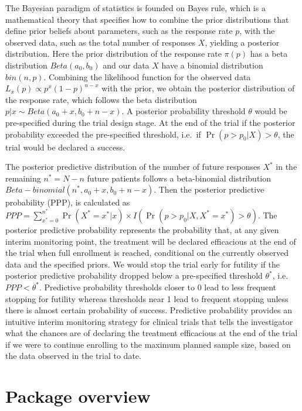 The Bayesian paradigm of statistics is founded on Bayes rule, which is a
mathematical theory that specifies how to combine the prior
distributions that define prior beliefs about parameters, such as the
response rate \(p\), with the observed data, such as the total number of
responses \(X\), yielding a posterior distribution. Here the prior
distribution of the response rate \(\pi(p)\) has a beta distribution
\(Beta(a_0, b_0)\) and our data \(X\) have a binomial distribution
\(bin(n, p)\). Combining the likelihood function for the observed data
\(L_x(p) \propto p^x (1-p)^{n-x}\) with the prior, we obtain the
posterior distribution of the response rate, which follows the beta
distribution \(p|x \sim Beta(a_0 + x, b_0 + n - x)\). A posterior
probability threshold \(\theta\) would be pre-specified during the trial
design stage. At the end of the trial if the posterior probability
exceeded the pre-specified threshold, i.e.~if
\(\Pr(p>p_0 | X) > \theta\), the trial would be declared a success.

The posterior predictive distribution of the number of future responses
\(X^*\) in the remaining \(n^*=N-n\) future patients follows a
beta-binomial distribution \(Beta-binomial(n^*, a_0 + x, b_0 + n - x)\).
Then the posterior predictive probability (PPP), is calculated as
\(PPP = \sum_{{x^*}=0}^{n^*} \Pr(X^*=x^*|x) \times I(\Pr(p>p_0 | X, X^*=x^*) > \theta)\).
The posterior predictive probability represents the probability that, at
any given interim monitoring point, the treatment will be declared
efficacious at the end of the trial when full enrollment is reached,
conditional on the currently observed data and the specified priors. We
would stop the trial early for futility if the posterior predictive
probability dropped below a pre-specified threshold \(\theta^*\),
i.e.~\(PPP<\theta^*\). Predictive probability thresholds closer to 0
lead to less frequent stopping for futility whereas thresholds near 1
lead to frequent stopping unless there is almost certain probability of
success. Predictive probability provides an intuitive interim monitoring
strategy for clinical trials that tells the investigator what the
chances are of declaring the treatment efficacious at the end of the
trial if we were to continue enrolling to the maximum planned sample
size, based on the data observed in the trial to date.

\hypertarget{package-overview}{%
\section{Package overview}\label{package-overview}}

